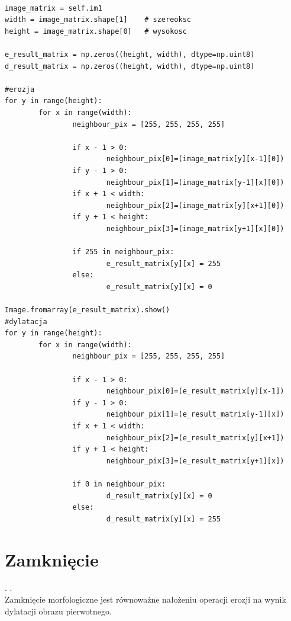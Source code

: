 \documentclass[final,a4paper,openany,12pt]{mwbk}
\begin{document}
\begin{lstlisting}[caption= Operacja otwarcia na obrazie binarnym]

image_matrix = self.im1
width = image_matrix.shape[1]    # szereoksc
height = image_matrix.shape[0]   # wysokosc

e_result_matrix = np.zeros((height, width), dtype=np.uint8)
d_result_matrix = np.zeros((height, width), dtype=np.uint8)

#erozja
for y in range(height):
        for x in range(width):  
                neighbour_pix = [255, 255, 255, 255]

                if x - 1 > 0:
                        neighbour_pix[0]=(image_matrix[y][x-1][0])
                if y - 1 > 0:
                        neighbour_pix[1]=(image_matrix[y-1][x][0])
                if x + 1 < width:
                        neighbour_pix[2]=(image_matrix[y][x+1][0])
                if y + 1 < height:
                        neighbour_pix[3]=(image_matrix[y+1][x][0])

                if 255 in neighbour_pix:
                        e_result_matrix[y][x] = 255
                else:
                        e_result_matrix[y][x] = 0 

Image.fromarray(e_result_matrix).show()
#dylatacja
for y in range(height):
        for x in range(width):  
                neighbour_pix = [255, 255, 255, 255]

                if x - 1 > 0:
                        neighbour_pix[0]=(e_result_matrix[y][x-1])
                if y - 1 > 0:
                        neighbour_pix[1]=(e_result_matrix[y-1][x])
                if x + 1 < width:
                        neighbour_pix[2]=(e_result_matrix[y][x+1])
                if y + 1 < height:
                        neighbour_pix[3]=(e_result_matrix[y+1][x])

                if 0 in neighbour_pix:
                        d_result_matrix[y][x] = 0
                else:
                        d_result_matrix[y][x] = 255   

\end{lstlisting}

\section{ Zamknięcie}
.
.\hfill\\
\indent
	Zamknięcie morfologiczne jest równoważne nałożeniu operacji erozji na wynik dylatacji obrazu pierwotnego.
\end{document}
